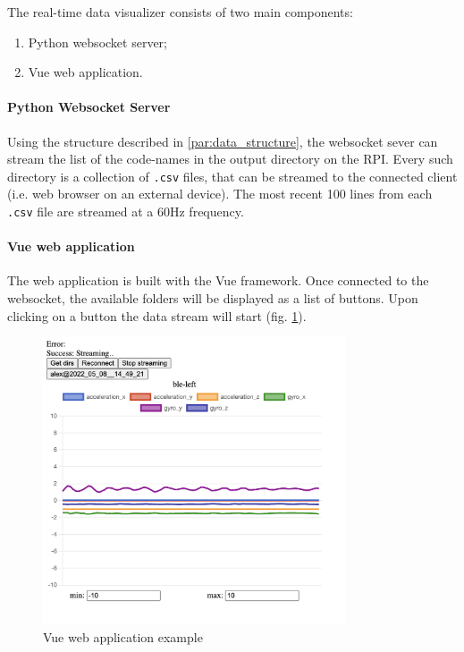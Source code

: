 The real-time data visualizer consists of two main components:

\begin{enumerate}
    \item Python websocket server;
    \item Vue web application.
\end{enumerate}

\paragraph{Python Websocket Server}

Using the structure described in \ref{par:data_structure}, the websocket sever can stream the list of the code-names in the output directory on the RPI. Every such directory is a collection of \texttt{.csv} files, that can be streamed to the connected client (i.e. web browser on an external device). The most recent 100 lines from each \texttt{.csv} file are streamed at a 60Hz frequency.

\paragraph{Vue web application}

The web application is built with the Vue framework. Once connected to the websocket, the available folders will be displayed as a list of buttons. Upon clicking on a button the data stream will start (fig. \ref{image:front}).

\begin{figure}[h]
\centering
\includegraphics[width=0.8\textwidth]{src/media/software/front.png}
\caption{Vue web application example}
\label{image:front}
\end{figure}